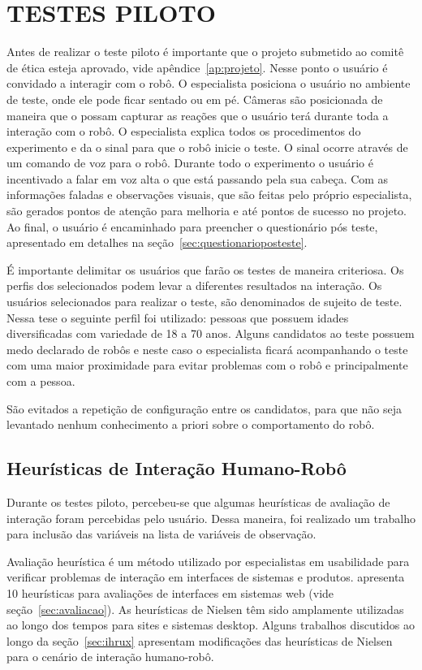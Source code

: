\section{TESTES PILOTO}
\label{sec:ec_testespiloto}
Antes de realizar o teste piloto é importante que o projeto submetido ao comitê de ética esteja aprovado, vide apêndice~\ref{ap:projeto}. Nesse ponto o usuário é convidado a interagir com o robô. O especialista posiciona o usuário no ambiente de teste, onde ele pode ficar sentado ou em pé. Câmeras são posicionada de maneira que o possam capturar as reações que o usuário terá durante toda a interação com o robô. O especialista explica todos os procedimentos do experimento e da o sinal para que o robô inicie o teste. O sinal ocorre através de um comando de voz para o robô. Durante todo o experimento o usuário é incentivado a falar em voz alta o que está passando pela sua cabeça. Com as informações faladas e observações visuais, que são feitas pelo próprio especialista, são gerados pontos de atenção para melhoria e até pontos de sucesso no projeto. Ao final, o usuário é encaminhado para preencher o questionário pós teste, apresentado em detalhes na seção~\ref{sec:questionarioposteste}.

É importante delimitar os usuários que farão os testes de maneira criteriosa. Os perfis dos selecionados podem levar a diferentes resultados na interação. Os usuários selecionados para realizar o teste, são denominados de sujeito de teste. Nessa tese o seguinte perfil foi utilizado: pessoas que possuem idades diversificadas com variedade de 18 a 70 anos. Alguns candidatos ao teste possuem medo declarado de robôs e neste caso o especialista ficará acompanhando o teste com uma maior proximidade para evitar problemas com o robô e principalmente com a pessoa.

São evitados a repetição de configuração entre os candidatos, para que não seja levantado nenhum conhecimento a priori sobre o comportamento do robô.

\subsection{Heurísticas de Interação Humano-Robô}
\label{sec:heuristicas}
Durante os testes piloto, percebeu-se que algumas heurísticas de avaliação de interação foram percebidas pelo usuário. Dessa maneira, foi realizado um trabalho para inclusão das variáveis na lista de variáveis de observação. 

Avaliação heurística é um método utilizado por especialistas em usabilidade para verificar problemas de interação em interfaces de sistemas e produtos.  apresenta 10 heurísticas para avaliações de interfaces em sistemas web (vide seção~\ref{sec:avaliacao}). As heurísticas de Nielsen têm sido amplamente utilizadas ao longo dos tempos para sites e sistemas desktop. Alguns trabalhos discutidos ao longo da seção~\ref{sec:ihrux} apresentam modificações das heurísticas de Nielsen para o cenário de interação humano-robô.

